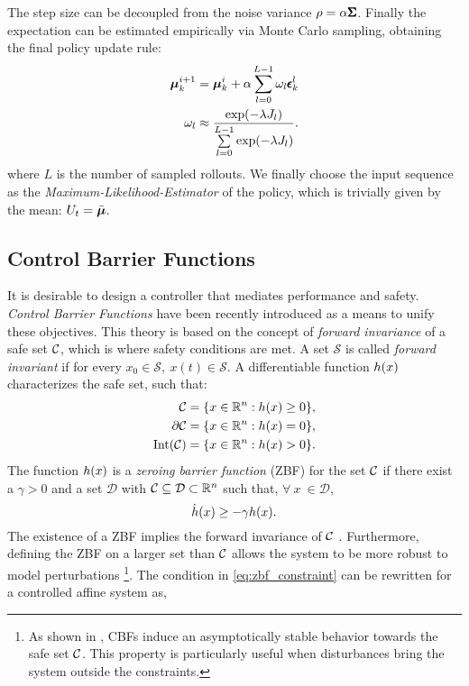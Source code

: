 The step size can be decoupled from the noise variance $\rho = \alpha \pmb{\Sigma} $. Finally the expectation can be estimated empirically via Monte Carlo sampling, obtaining the final policy update rule:
\begin{align} \label{eq:update_rule}
  \boldsymbol{\mu}^{i+1}_{k} &= \boldsymbol{\mu}^{i}_{k} + \alpha  \sum \limits_{l=0}^{L-1}  \omega_l \pmb{\epsilon}_{k}^{l} \\
  \omega_l  &\approx \frac{\exp ( -\lambda J_l )}{\sum \limits_{l=0}^{L-1} \exp ( -\lambda J_l)}. \label{eq:weighting}
\end{align}
where $L$ is the number of sampled rollouts. 
We finally choose the input sequence as the \emph{Maximum-Likelihood-Estimator} of the policy, which is trivially given by the mean: $U_t = \bar{\boldsymbol{\mu}}$.

\subsection{Control Barrier Functions}
It is desirable to design a controller that mediates performance and safety. \emph{Control Barrier Functions} have been recently introduced as a means to unify these objectives. This theory is based on the concept of \emph{forward invariance} of a safe set $\mathcal{C} $, which is where safety conditions are met. A set $\mathcal{S}$ is called \emph{forward invariant} if for every $x_0 \in \mathcal{S},\ x(t) \in \mathcal{S}$. A differentiable function $h(x)$  characterizes the safe set, such that:
\begin{align*}
    \mathcal{C} &= \{ x \in \mathbb{R}^{n} : h(x) \geq 0 \}, \\
    \partial \mathcal{C} &= \{ x \in \mathbb{R}^{n} : h(x) = 0 \}, \\
    \text{Int}(\mathcal{C}) &= \{ x \in \mathbb{R}^{n} : h(x) > 0 \}.
\end{align*}
The function $h(x)$ is a \emph{zeroing barrier function} (ZBF) for the set $ \mathcal{C} $ if there exist a $\gamma > 0$ and a set $\mathcal{D}$ with $\mathcal{C} \subseteq \mathcal{D} \subset \mathbb{R}^{n}$ such that, $\forall \  x \  \in \mathcal{D}$, 
\begin{equation} \label{eq:zbf_constraint}
    \dot{h}(x) \geq -\gamma h(x).
\end{equation}
The existence of a ZBF implies the forward invariance of $\mathcal{C}$ \cite{ames2016control}. Furthermore, defining the ZBF on a larger set than $\mathcal{C}$ allows the system to be more robust to model perturbations \footnote{As shown in \cite{ames2016control}, CBFs induce an asymptotically stable behavior towards the safe set $\mathcal{C}$. This property is particularly useful when disturbances bring the system outside the constraints.}. The condition in \eqn \ref{eq:zbf_constraint} can be rewritten for a controlled affine system as,
